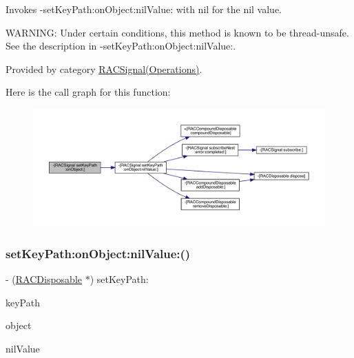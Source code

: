 Invokes -\/set\+Key\+Path\+:on\+Object\+:nil\+Value\+: with {\ttfamily nil} for the nil value.

W\+A\+R\+N\+I\+NG\+: Under certain conditions, this method is known to be thread-\/unsafe. See the description in -\/set\+Key\+Path\+:on\+Object\+:nil\+Value\+:. 

Provided by category \mbox{\hyperlink{category_r_a_c_signal_07_operations_08_ada2a2f51a30fb8bef13819c50ebfbf85}{R\+A\+C\+Signal(\+Operations)}}.

Here is the call graph for this function\+:\nopagebreak
\begin{figure}[H]
\begin{center}
\leavevmode
\includegraphics[width=350pt]{interface_r_a_c_signal_ada2a2f51a30fb8bef13819c50ebfbf85_cgraph}
\end{center}
\end{figure}
\mbox{\label{interface_r_a_c_signal_a3d59cca19be3e985aa5a08cb0386faeb}} 
\subsubsection{\texorpdfstring{set\+Key\+Path\+:on\+Object\+:nil\+Value\+:()}{setKeyPath:onObject:nilValue:()}\hspace{0.1cm}{\footnotesize\ttfamily [1/3]}}
{\footnotesize\ttfamily -\/ (\mbox{\hyperlink{interface_r_a_c_disposable}{R\+A\+C\+Disposable}} $\ast$) set\+Key\+Path\+: \begin{DoxyParamCaption}\item[{(N\+S\+String $\ast$)}]{key\+Path }\item[{onObject:(N\+S\+Object $\ast$)}]{object }\item[{nilValue:(id)}]{nil\+Value }\end{DoxyParamCaption}}

